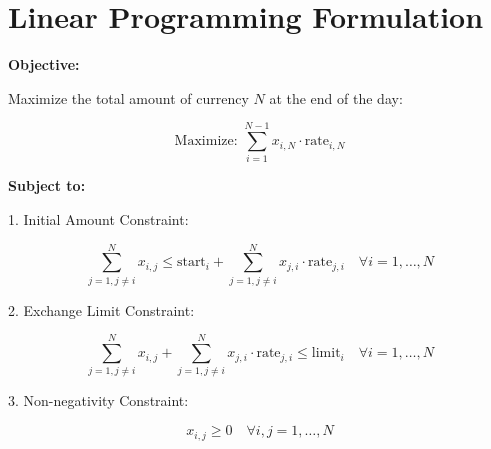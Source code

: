 \documentclass{article}
\begin{document}
\section*{Linear Programming Formulation}

\textbf{Objective:}

Maximize the total amount of currency \( N \) at the end of the day:

\[
\text{Maximize: } \sum_{i=1}^{N-1} x_{i,N} \cdot \text{rate}_{i,N}
\]

\textbf{Subject to:}

1. Initial Amount Constraint:

\[
\sum_{j=1, j \neq i}^{N} x_{i,j} \leq \text{start}_i + \sum_{j=1, j \neq i}^{N} x_{j,i} \cdot \text{rate}_{j,i} \quad \forall i = 1, \ldots, N
\]

2. Exchange Limit Constraint:

\[
\sum_{j=1, j \neq i}^{N} x_{i,j} + \sum_{j=1, j \neq i}^{N} x_{j,i} \cdot \text{rate}_{j,i} \leq \text{limit}_i \quad \forall i = 1, \ldots, N
\]

3. Non-negativity Constraint:

\[
x_{i,j} \geq 0 \quad \forall i, j = 1, \ldots, N
\]
\end{document}
